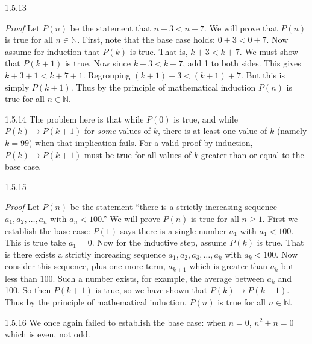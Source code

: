 \documentclass[11pt,]{book}
\makeatletter
\theoremstyle{ptxplainnotitle}
\theoremstyle{ptxplaintitle}
\renewcommand*{\proofname}{Proof}
\renewenvironment{proof}[1][\proofname]{\par
  \pushQED{\qed}%
  \normalfont \topsep6\p@\@plus6\p@\relax
  \trivlist
  \item\relax
    {\itshape
    #1\@addpunct{.}}\hspace\labelsep\ignorespaces
}{%
  \popQED\endtrivlist\@endpefalse
}
\theoremstyle{ptxdefinitionnotitle}
\theoremstyle{ptxdefinitiontitle}
\theoremstyle{ptxdefinitionnotitle}
\theoremstyle{ptxdefinitiontitle}
\theoremstyle{ptxdefinitionnotitle}
\theoremstyle{ptxdefinitiontitle}
\theoremstyle{ptxdefinitiontitlenonumber}
\theoremstyle{ptxdefinitiontitlenonumber}
\numberwithin{equation}{chapter}
\newcommand{\N}{\mathbb N}
\newcommand{\imp}{\rightarrow}
\newcommand{\lt}{<}
\makeatother
\begin{document}
\begin{divisionexercise}{1.5.13}
\textbf{}\begin{proof}\hypertarget{proof-12}{}
\hypertarget{p-625}{}%
Let \(P(n)\) be the statement that \(n + 3 \lt  n + 7\). We will prove that \(P(n)\) is true for all \(n \in \N\). First, note that the base case holds: \(0+3 \lt  0+7\). Now assume for induction that \(P(k)\) is true. That is, \(k+3 \lt  k+7\). We must show that \(P(k+1)\) is true. Now since \(k + 3 \lt  k + 7\), add 1 to both sides. This gives \(k + 3 + 1 \lt  k + 7 + 1\). Regrouping \((k+1) + 3 \lt  (k+1) + 7\). But this is simply \(P(k+1)\). Thus by the principle of mathematical induction \(P(n)\) is true for all \(n \in \N\).%
\end{proof}
\end{divisionexercise}%
\begin{divisionexercise}{1.5.14}
\textbf{}\hypertarget{p-628}{}%
The problem here is that while \(P(0)\) is true, and while \(P(k) \imp P(k+1)\) for \emph{some} values of \(k\), there is at least one value of \(k\) (namely \(k = 99\)) when that implication fails. For a valid proof by induction, \(P(k) \imp P(k+1)\) must be true for all values of \(k\) greater than or equal to the base case.%
\end{divisionexercise}%
\begin{divisionexercise}{1.5.15}
\textbf{}\begin{proof}\hypertarget{proof-14}{}
\hypertarget{p-630}{}%
Let \(P(n)\) be the statement ``there is a strictly increasing sequence \(a_1, a_2, \ldots, a_n\) with \(a_n \lt  100\).'' We will prove \(P(n)\) is true for all \(n \ge 1\). First we establish the base case: \(P(1)\) says there is a single number \(a_1\) with \(a_1 \lt  100\). This is true \textendash{} take \(a_1 = 0\). Now for the inductive step, assume \(P(k)\) is true. That is there exists a strictly increasing sequence \(a_1, a_2, a_3, \ldots, a_k\) with \(a_k \lt  100\). Now consider this sequence, plus one more term, \(a_{k+1}\) which is greater than \(a_k\) but less than \(100\). Such a number exists, for example, the average between \(a_k\) and 100. So then \(P(k+1)\) is true, so we have shown that \(P(k) \imp P(k+1)\). Thus by the principle of mathematical induction, \(P(n)\) is true for all \(n \in \N\).%
\end{proof}
\end{divisionexercise}%
\begin{divisionexercise}{1.5.16}
\textbf{}\hypertarget{p-633}{}%
We once again failed to establish the base case: when \(n = 0\), \(n^2 + n = 0\) which is even, not odd.%
\end{divisionexercise}%
\end{document}
